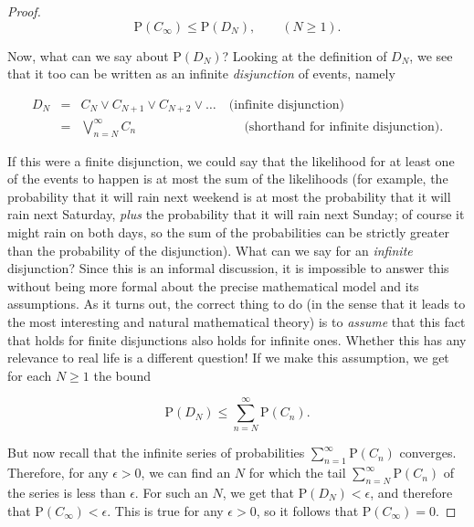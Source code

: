 \begin{proof}
\[
\mathrm{P}(C_\infty) \le \mathrm{P}(D_N), \qquad (N\ge 1).
\]

\noindent Now, what can we say about $\mathrm{P}(D_N)$? Looking
at the definition of $D_N$, we see that it too can be
written as an infinite \emph{disjunction} of events, namely

\begin{eqnarray*}
D_N &=& C_N \vee C_{N+1} \vee C_{N+2} \vee \ldots \quad \textrm{(infinite disjunction)} \\
&=& \bigvee_{n=N}^\infty C_n \qquad\qquad\qquad\qquad\ \  \textrm{(shorthand for infinite disjunction)}.
\end{eqnarray*}

\noindent If this were a finite disjunction, we could say that
the likelihood for at least one of the events to
happen is at most the sum of the likelihoods (for
example, the probability that it will rain next
weekend is at most the probability that it will rain
next Saturday, \emph{plus} the probability that it will
rain next Sunday; of course it might rain on both
days, so the sum of the probabilities can be strictly
greater than the probability of the disjunction). What
can we say for an \emph{infinite} disjunction? Since this
is an informal discussion, it is impossible to answer
this without being more formal about the precise
mathematical model and its assumptions. As it turns
out, the correct thing to do (in the sense that it
leads to the most interesting and natural mathematical
theory) is to \emph{assume} that this fact that holds for
finite disjunctions also holds for infinite ones.
Whether this has any relevance to real life is a
different question! If we make this assumption, we get
for each $N\ge 1$ the bound

\[
\mathrm{P}(D_N) \le \sum_{n=N}^\infty \mathrm{P}(C_n).
\]

\noindent But now recall that the infinite series of
probabilities $\sum_{n=1}^\infty \mathrm{P}(C_n)$
converges. Therefore, for any $\epsilon>0$, we can
find an $N$ for which the tail
$\sum_{n=N}^\infty \mathrm{P}(C_n)$ of the series is
less than $\epsilon$. For such an $N$, we get that
$\mathrm{P}(D_N)< \epsilon$, and therefore that
$\mathrm{P}(C_\infty)<\epsilon$. This is true for any
$\epsilon>0$, so it follows that
$\mathrm{P}(C_\infty)=0$.
\end{proof}
